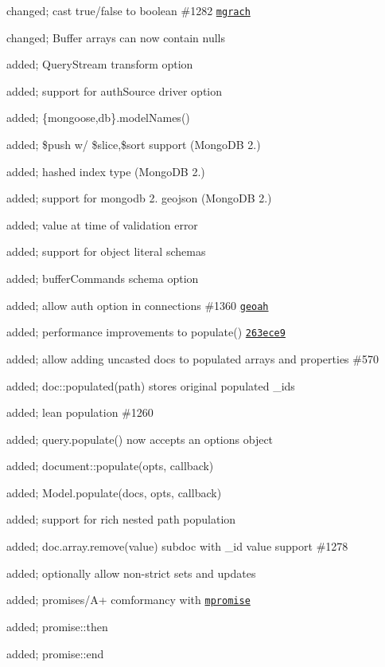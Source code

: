 \begin{DoxyItemize}
\item changed; cast \textquotesingle{}true\textquotesingle{}/\textquotesingle{}false\textquotesingle{} to boolean \#1282 \href{https://github.com/mgrach}{\tt mgrach}
\item changed; Buffer arrays can now contain nulls
\item added; Query\+Stream transform option
\item added; support for auth\+Source driver option
\item added; \{mongoose,db\}.model\+Names()
\item added; \$push w/ \$slice,\$sort support (Mongo\+DB 2.)
\item added; hashed index type (Mongo\+DB 2.)
\item added; support for mongodb 2. geojson (Mongo\+DB 2.)
\item added; value at time of validation error
\item added; support for object literal schemas
\item added; buffer\+Commands schema option
\item added; allow auth option in connections \#1360 \href{https://github.com/geoah}{\tt geoah}
\item added; performance improvements to populate() \href{https://github.com/LearnBoost/mongoose/commit/263ece9}{\tt 263ece9}
\item added; allow adding uncasted docs to populated arrays and properties \#570
\item added; doc\+::populated(path) stores original populated \+\_\+ids
\item added; lean population \#1260
\item added; query.\+populate() now accepts an options object
\item added; document\+::populate(opts, callback)
\item added; Model.\+populate(docs, opts, callback)
\item added; support for rich nested path population
\item added; doc.\+array.\+remove(value) subdoc with \+\_\+id value support \#1278
\item added; optionally allow non-\/strict sets and updates
\item added; promises/\+A+ comformancy with \href{https://github.com/aheckmann/mpromise}{\tt mpromise}
\item added; promise\+::then
\item added; promise\+::end

\end{DoxyItemize}
